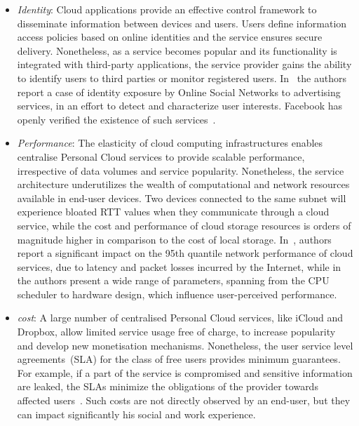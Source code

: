 \begin{itemize}
  \item{\it Identity}\/: Cloud applications provide an effective control
       framework to disseminate information between devices and users.  Users
       define information access policies based on online identities and the
       service ensures secure delivery.  Nonetheless, as a service becomes
       popular and its functionality is integrated with third-party
       applications, the service provider gains the ability to identify users to
       third parties or monitor registered users.  In~\cite{Krishnamurthy2009}
       the authors report a case of identity exposure by Online Social Networks
       to advertising services, in an effort to detect and characterize user
       interests.  Facebook has openly verified the existence of such
       services~\cite{beacon-facebook}. 

\item {\it Performance}\/: The elasticity of cloud computing infrastructures
      enables centralise Personal Cloud services to provide scalable
      performance, irrespective of data volumes and service popularity.
      Nonetheless, the service architecture underutilizes the wealth of
      computational and network resources available in end-user devices.  Two
      devices connected to the same subnet will experience bloated RTT values
      when they communicate through a cloud service, while the cost and
      performance of cloud storage resources is orders of magnitude higher in
      comparison to the cost of local storage.  In~\cite{Wittie2010}, authors
      report a significant impact on the 95th quantile network performance of
      cloud services, due to latency and packet losses incurred by the Internet,
      while in~\cite{Dean13} the authors present a wide range of parameters,
      spanning from the CPU scheduler to hardware design, which influence
      user-perceived performance.

\item {\it cost}\/: A large number of centralised Personal Cloud services, like
      iCloud and Dropbox, allow limited service usage free of charge, to
      increase popularity and develop new monetisation mechanisms.  Nonetheless,
      the user service level agreements~(SLA) for the class of free users
      provides minimum guarantees. For example, if a part of the service is
      compromised and sensitive information are leaked, the SLAs minimize the
      obligations of the provider towards affected users~\cite{cnet-dropbox}.
      Such costs are not directly observed by an end-user, but they can impact
      significantly his social and work experience. 


\end{itemize}

